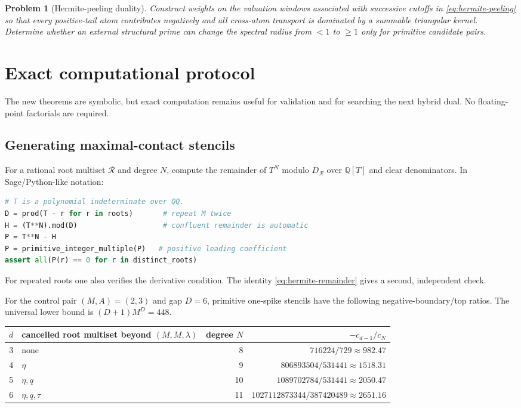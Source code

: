 \documentclass[11pt,oneside]{article}
\newtheorem{problem}[theorem]{Problem}
\theoremstyle{definition}
\theoremstyle{remark}
\newcommand{\Q}{\mathbb Q}
\begin{document}
\begin{problem}[Hermite-peeling duality]
Construct weights on the valuation windows associated with successive cutoffs in
\eqref{eq:hermite-peeling} so that every positive-tail atom contributes negatively and all
cross-atom transport is dominated by a summable triangular kernel.  Determine whether an
external structural prime can change the spectral radius from $<1$ to $\ge1$ only for
primitive candidate pairs.
\end{problem}

\section{Exact computational protocol}
\label{sec:computation}

The new theorems are symbolic, but exact computation remains useful for validation and for
searching the next hybrid dual.  No floating-point factorials are required.

\subsection{Generating maximal-contact stencils}

For a rational root multiset $\mathcal R$ and degree $N$, compute the remainder of $T^N$
modulo $D_{\mathcal R}$ over $\Q[T]$ and clear denominators.  In Sage/Python-like notation:

\begin{lstlisting}[language=Python]
# T is a polynomial indeterminate over QQ.
D = prod(T - r for r in roots)       # repeat M twice
H = (T**N).mod(D)                    # confluent remainder is automatic
P = T**N - H
P = primitive_integer_multiple(P)   # positive leading coefficient
assert all(P(r) == 0 for r in distinct_roots)
\end{lstlisting}

For repeated roots one also verifies the derivative condition.  The identity
\eqref{eq:hermite-remainder} gives a second, independent check.

For the control pair $(M,A)=(2,3)$ and gap $D=6$, primitive one-spike stencils have the
following negative-boundary/top ratios.  The universal lower bound is
$(D+1)M^D=448$.

\begin{center}
\begin{tabularx}{0.96\textwidth}{c>{\raggedright\arraybackslash}Xrr}
\toprule
$d$ & cancelled root multiset beyond $(M,M,\lambda)$ & degree $N$ &
$-c_{d-1}/c_N$\\
\midrule
3 & none & 8 & $716224/729\approx982.47$\\
4 & $\eta$ & 9 & $806893504/531441\approx1518.31$\\
5 & $\eta,q$ & 10 & $1089702784/531441\approx2050.47$\\
6 & $\eta,q,\tau$ & 11 & $1027112873344/387420489\approx2651.16$\\
\bottomrule
\end{tabularx}
\end{center}
\end{document}

